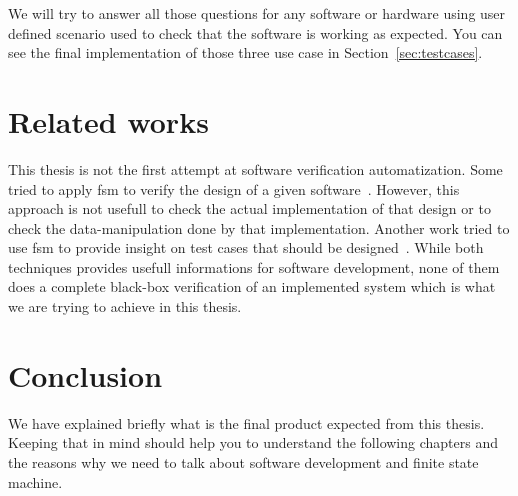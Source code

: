 \documentclass[12pt]{article}
\theoremstyle{definition}
\theoremstyle{definition}
\theoremstyle{remark}
\begin{document}
We will try to answer all those questions for any software or hardware using user defined scenario used to check that the software is working as expected. You can see the final implementation of those three use case in Section~\ref{sec:testcases}.



\section{Related works}


This thesis is not the first attempt at software verification automatization. Some tried to apply \gls{fsm} to verify the design of a given software~\cite{Chow:1978:TSD:1313335.1313730}. However, this approach is not usefull to check the actual implementation of that design or to check the data-manipulation done by that implementation. Another work tried to use \gls{fsm} to provide insight on test cases that should be designed~\cite{10.1007/978-3-540-39929-2_3}. While both techniques provides usefull informations for software development, none of them does a complete black-box verification of an implemented system which is what we are trying to achieve in this thesis.


\section{Conclusion}


We have explained briefly what is the final product expected from this thesis. Keeping that in mind should help you to understand the following chapters and the reasons why we need to talk about software development and finite state machine.


\end{document}
